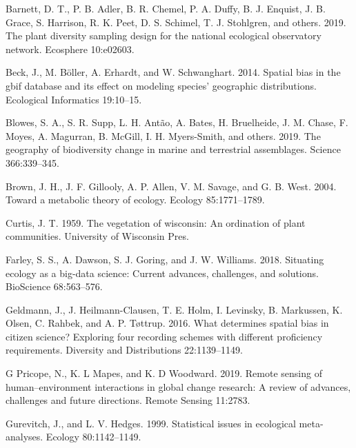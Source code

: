 \documentclass[
  12pt,
]{article}
\newlength{\cslhangindent}
\newenvironment{cslreferences}%
  {\setlength{\parindent}{0pt}%
  \everypar{\setlength{\hangindent}{\cslhangindent}}\ignorespaces}%
  {\par}
\begin{document}
\hypertarget{refs}{}
\begin{cslreferences}
\leavevmode\hypertarget{ref-barnett2019plant}{}%
Barnett, D. T., P. B. Adler, B. R. Chemel, P. A. Duffy, B. J. Enquist, J. B. Grace, S. Harrison, R. K. Peet, D. S. Schimel, T. J. Stohlgren, and others. 2019. The plant diversity sampling design for the national ecological observatory network. Ecosphere 10:e02603.

\leavevmode\hypertarget{ref-beck2014spatial}{}%
Beck, J., M. Böller, A. Erhardt, and W. Schwanghart. 2014. Spatial bias in the gbif database and its effect on modeling species' geographic distributions. Ecological Informatics 19:10--15.

\leavevmode\hypertarget{ref-blowes2019geography}{}%
Blowes, S. A., S. R. Supp, L. H. Antão, A. Bates, H. Bruelheide, J. M. Chase, F. Moyes, A. Magurran, B. McGill, I. H. Myers-Smith, and others. 2019. The geography of biodiversity change in marine and terrestrial assemblages. Science 366:339--345.

\leavevmode\hypertarget{ref-brown2004toward}{}%
Brown, J. H., J. F. Gillooly, A. P. Allen, V. M. Savage, and G. B. West. 2004. Toward a metabolic theory of ecology. Ecology 85:1771--1789.

\leavevmode\hypertarget{ref-curtis1959vegetation}{}%
Curtis, J. T. 1959. The vegetation of wisconsin: An ordination of plant communities. University of Wisconsin Pres.

\leavevmode\hypertarget{ref-farley2018situating}{}%
Farley, S. S., A. Dawson, S. J. Goring, and J. W. Williams. 2018. Situating ecology as a big-data science: Current advances, challenges, and solutions. BioScience 68:563--576.

\leavevmode\hypertarget{ref-geldmann2016determines}{}%
Geldmann, J., J. Heilmann-Clausen, T. E. Holm, I. Levinsky, B. Markussen, K. Olsen, C. Rahbek, and A. P. Tøttrup. 2016. What determines spatial bias in citizen science? Exploring four recording schemes with different proficiency requirements. Diversity and Distributions 22:1139--1149.

\leavevmode\hypertarget{ref-g2019remote}{}%
G Pricope, N., K. L Mapes, and K. D Woodward. 2019. Remote sensing of human--environment interactions in global change research: A review of advances, challenges and future directions. Remote Sensing 11:2783.

\leavevmode\hypertarget{ref-gurevitch1999statistical}{}%
Gurevitch, J., and L. V. Hedges. 1999. Statistical issues in ecological meta-analyses. Ecology 80:1142--1149.


\end{cslreferences}
\end{document}
